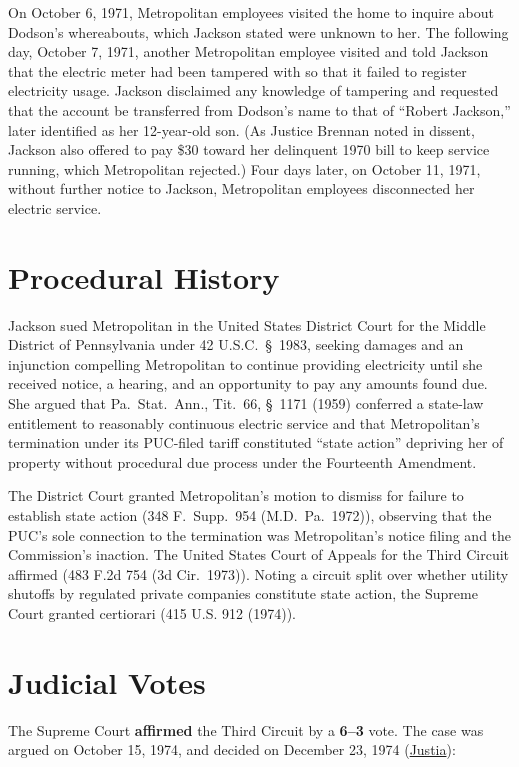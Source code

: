 \documentclass[12pt]{article}
\begin{document}
On October 6, 1971, Metropolitan employees visited the home to inquire about Dodson's whereabouts, which Jackson stated were unknown to her. The following day, October 7, 1971, another Metropolitan employee visited and told Jackson that the electric meter had been tampered with so that it failed to register electricity usage. Jackson disclaimed any knowledge of tampering and requested that the account be transferred from Dodson's name to that of ``Robert Jackson,'' later identified as her 12-year-old son. (As Justice Brennan noted in dissent, Jackson also offered to pay \$30 toward her delinquent 1970 bill to keep service running, which Metropolitan rejected.) Four days later, on October 11, 1971, without further notice to Jackson, Metropolitan employees disconnected her electric service.

\section{Procedural History}
Jackson sued Metropolitan in the United States District Court for the Middle District of Pennsylvania under 42 U.S.C.\ \S~1983, seeking damages and an injunction compelling Metropolitan to continue providing electricity until she received notice, a hearing, and an opportunity to pay any amounts found due. She argued that Pa.\ Stat.\ Ann., Tit.~66, \S~1171 (1959) conferred a state-law entitlement to reasonably continuous electric service and that Metropolitan's termination under its PUC-filed tariff constituted ``state action'' depriving her of property without procedural due process under the Fourteenth Amendment.

The District Court granted Metropolitan's motion to dismiss for failure to establish state action (348 F.\ Supp.\ 954 (M.D.\ Pa.\ 1972)), observing that the PUC's sole connection to the termination was Metropolitan's notice filing and the Commission's inaction. The United States Court of Appeals for the Third Circuit affirmed (483 F.2d 754 (3d Cir.\ 1973)). Noting a circuit split over whether utility shutoffs by regulated private companies constitute state action, the Supreme Court granted certiorari (415 U.S. 912 (1974)).

\section{Judicial Votes}
The Supreme Court \textbf{affirmed} the Third Circuit by a \textbf{6--3} vote. The case was argued on October 15, 1974, and decided on December 23, 1974 (\href{https://supreme.justia.com/cases/federal/us/419/345/}{Justia}):
\end{document}
